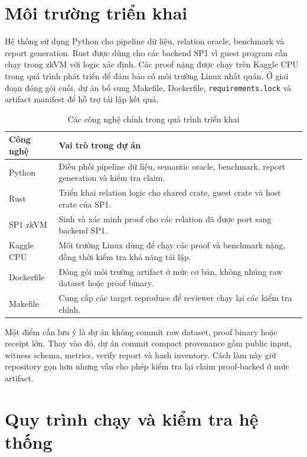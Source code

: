 \documentclass[12pt,a4paper,oneside]{report}
\newcommand{\code}[1]{\texttt{#1}}
\begin{document}
\section{Môi trường triển khai}

Hệ thống sử dụng Python cho pipeline dữ liệu, relation oracle, benchmark và report generation. Rust được dùng cho các backend SP1 vì guest program cần chạy trong zkVM với logic xác định. Các proof nặng được chạy trên Kaggle CPU trong quá trình phát triển để đảm bảo có môi trường Linux nhất quán. Ở giai đoạn đóng gói cuối, dự án bổ sung Makefile, Dockerfile, \code{requirements.lock} và artifact manifest để hỗ trợ tái lập kết quả.

\begin{table}[H]
\centering
\caption{Các công nghệ chính trong quá trình triển khai}
\begin{tabularx}{\textwidth}{p{} p{}}
\toprule
Công nghệ & Vai trò trong dự án \\
\midrule
Python & Điều phối pipeline dữ liệu, semantic oracle, benchmark, report generation và kiểm tra claim. \\
Rust & Triển khai relation logic cho shared crate, guest crate và host crate của SP1. \\
SP1 zkVM & Sinh và xác minh proof cho các relation đã được port sang backend SP1. \\
Kaggle CPU & Môi trường Linux dùng để chạy các proof và benchmark nặng, đồng thời kiểm tra khả năng tái lập. \\
Dockerfile & Đóng gói môi trường artifact ở mức cơ bản, không nhúng raw dataset hoặc proof binary. \\
Makefile & Cung cấp các target reproduce để reviewer chạy lại các kiểm tra chính. \\
\bottomrule
\end{tabularx}
\end{table}

Một điểm cần lưu ý là dự án không commit raw dataset, proof binary hoặc receipt lớn. Thay vào đó, dự án commit compact provenance gồm public input, witness schema, metrics, verify report và hash inventory. Cách làm này giữ repository gọn hơn nhưng vẫn cho phép kiểm tra lại claim proof-backed ở mức artifact.

\section{Quy trình chạy và kiểm tra hệ thống}
\end{document}
